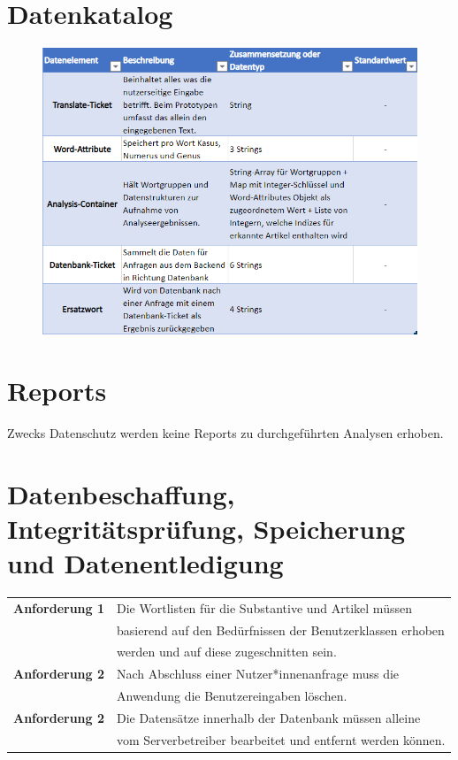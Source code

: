 \documentclass[paper=a4, parskip=half]{scrreprt}
\begin{document}
\pagebreak

\section{Datenkatalog}
\begin{figure}[hbt!]
  \centering
  \includegraphics[scale=1.0]{Bilder/Datenkatalog.png}
  \vspace{-0.25cm}
\end{figure}

\section{Reports}
Zwecks Datenschutz werden keine Reports zu durchgeführten Analysen erhoben.

\pagebreak

\section{Datenbeschaffung, Integritätsprüfung, Speicherung und Datenentledigung}
\begin{table}[!htb]
\begin{tabular}{ll}
\textbf{Anforderung 1} & Die Wortlisten für die Substantive und Artikel müssen \\
& basierend auf den Bedürfnissen der Benutzerklassen erhoben \\
& werden und auf diese zugeschnitten sein. \vspace{0.15cm} \\
\textbf{Anforderung 2} & Nach Abschluss einer Nutzer*innenanfrage muss die \\
& Anwendung die Benutzereingaben löschen. \vspace{0.15cm} \\
\textbf{Anforderung 2} & Die Datensätze innerhalb der Datenbank müssen alleine \\
& vom Serverbetreiber bearbeitet und entfernt werden können. \vspace{0.15cm} \\
\end{tabular}
\end{table}
\end{document}
